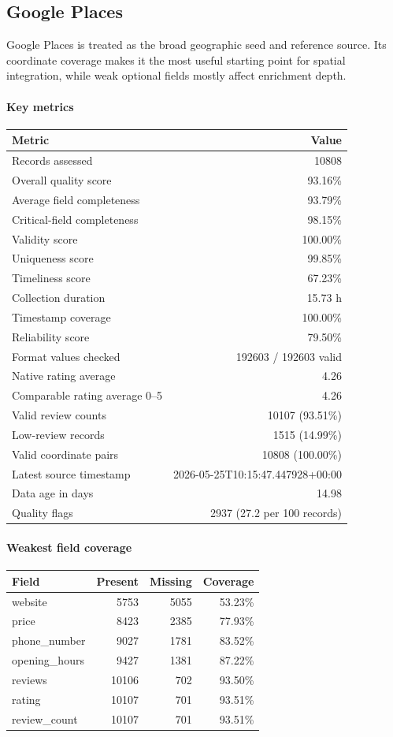 \subsection{Google Places}

Google Places is treated as the broad geographic seed and reference source. Its coordinate coverage makes it the most useful starting point for spatial integration, while weak optional fields mostly affect enrichment depth.

\paragraph{Key metrics}
\begin{tabular}{lr}
\toprule
Metric & Value \\
\midrule
Records assessed & 10808 \\
Overall quality score & 93.16\% \\
Average field completeness & 93.79\% \\
Critical-field completeness & 98.15\% \\
Validity score & 100.00\% \\
Uniqueness score & 99.85\% \\
Timeliness score & 67.23\% \\
Collection duration & 15.73 h \\
Timestamp coverage & 100.00\% \\
Reliability score & 79.50\% \\
Format values checked & 192603 / 192603 valid \\
Native rating average & 4.26 \\
Comparable rating average 0--5 & 4.26 \\
Valid review counts & 10107 (93.51\%) \\
Low-review records & 1515 (14.99\%) \\
Valid coordinate pairs & 10808 (100.00\%) \\
Latest source timestamp & 2026-05-25T10:15:47.447928+00:00 \\
Data age in days & 14.98 \\
Quality flags & 2937 (27.2 per 100 records) \\
\bottomrule
\end{tabular}

\paragraph{Weakest field coverage}
\begin{tabular}{lrrr}
\toprule
Field & Present & Missing & Coverage \\
\midrule
website & 5753 & 5055 & 53.23\% \\
price & 8423 & 2385 & 77.93\% \\
phone\_number & 9027 & 1781 & 83.52\% \\
opening\_hours & 9427 & 1381 & 87.22\% \\
reviews & 10106 & 702 & 93.50\% \\
rating & 10107 & 701 & 93.51\% \\
review\_count & 10107 & 701 & 93.51\% \\
\bottomrule
\end{tabular}


